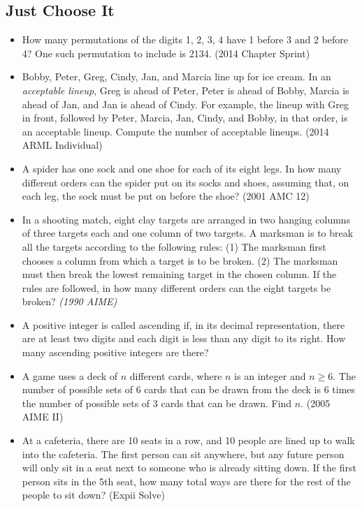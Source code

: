 \documentclass{article}
\begin{document}
\subsection{Just Choose It}

\begin{itemize}

\item How many permutations of the digits 1, 2, 3, 4 have 1 before 3 and 2 before 4? One such permutation to include is 2134. (2014 Chapter Sprint)

\item Bobby, Peter, Greg, Cindy, Jan, and Marcia line up for ice cream. In an \emph{acceptable lineup}, Greg is ahead of Peter, Peter is ahead of Bobby, Marcia is ahead of Jan, and Jan is ahead of Cindy. For example, the lineup with Greg in front, followed by Peter, Marcia, Jan, Cindy, and Bobby, in that order, is an acceptable lineup. Compute the number of acceptable lineups. (2014 ARML Individual)

\item A spider has one sock and one shoe for each of its eight legs. In how many different orders can the spider put on its socks and shoes, assuming that, on each leg, the sock must be put on before the shoe? (2001 AMC 12)

\item In a shooting match, eight clay targets are arranged in two hanging columns of three targets each and one column of two targets. A marksman is to break all the targets according to the following rules: \newline
(1) The marksman first chooses a column from which a target is to be broken.\newline
(2) The marksman must then break the lowest remaining target in the chosen column. \newline
If the rules are followed, in how many different orders can the eight targets be broken? \emph{(1990 AIME)}

\item A positive integer is called ascending if, in its decimal representation, there are at least two digits and each digit is less than any digit to its right. How many ascending positive integers are there?

\item A game uses a deck of $n$ different cards, where $n$ is an integer and $n\ge 6$. The number of possible sets of 6 cards that can be drawn from the deck is 6 times the number of possible sets of 3 cards that can be drawn. Find $n$. (2005 AIME II)

\item At a cafeteria, there are 10 seats in a row, and 10 people are lined up to walk into the cafeteria. The first person can sit anywhere, but any future person will only sit in a seat next to someone who is already sitting down. If the first person sits in the 5th seat, how many total ways are there for the rest of the people to sit down? (Expii Solve)

\end{itemize}
\end{document}

